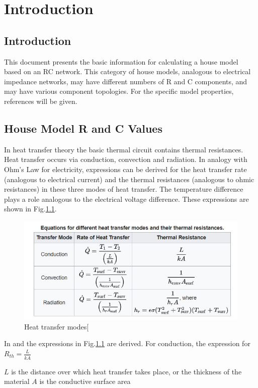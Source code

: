 \chapter{Introduction}

\section{Introduction}

This document presents the basic information for calculating a house model based on an RC network. This category of house models, analogous to electrical impedance networks, may have different numbers of R and C components, and may have various component topologies. For the specific model properties, references will be given.


\section{House Model R and C Values}

In heat transfer theory the basic thermal circuit contains thermal resistances. Heat transfer occurs via conduction, convection and radiation. In analogy with Ohm's Law for electricity, expressions can be derived for the heat transfer rate (analogous to electrical current) and the thermal resistances (analogous to ohmic resistances) in these three modes of heat transfer. The temperature difference plays a role analogous to the electrical voltage difference. These expressions are shown in Fig.\ref{table_1}.
\begin{figure}[H]
	\centering
	\includegraphics[width=0.8\columnwidth]{Pictures/heat transfer mode.JPG}
	\caption[Short title]{Heat transfer modes[\cite{GIGO}}
	\label{table_1}
\end{figure}

In \cite{HTTHERMO} and \cite{FUND} the expressions in Fig.\ref{table_1} are derived.
For conduction, the expression for $R_{th} = \frac{L}{k\dot A}$

$L$ is the distance over which heat transfer takes place, or the thickness of the material
$A$ is the conductive surface area

